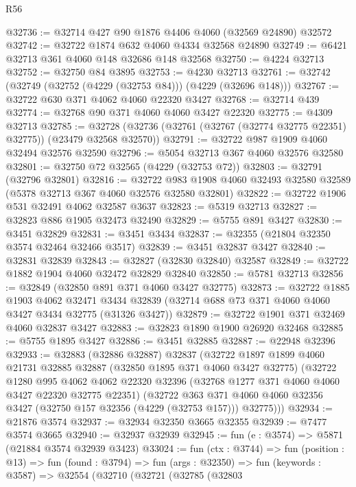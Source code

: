 \begin{lexlean}{R56}
\begin{coremodule}
@32736 := @32714 @427 @90 @1876 @4406 @4060 (@32569 @24890) @32572
@32742 := @32722 @1874 @632 @4060 @4334 @32568 @24890
@32749 := @6421 @32713 @361 @4060 @148 @32686 @148 @32568
@32750 := @4224 @32713
@32752 := @32750 @84 @3895
@32753 := @4230 @32713
@32761 := @32742 (@32749 (@32752 (@4229 (@32753 @84))) (@4229 (@32696 @148)))
@32767 := @32722 @630 @371 @4062 @4060 @22320 @3427
@32768 := @32714 @439
@32774 := @32768 @90 @371 @4060 @4060 @3427 @22320
@32775 := @4309 @32713
@32785 := @32728 (@32736 (@32761 (@32767 (@32774 @32775 @22351) @32775)) (@23479 @32568 @32570))
@32791 := @32722 @987 @1909 @4060 @32494 @32576 @32590
@32796 := @5054 @32713 @367 @4060 @32576 @32580
@32801 := @32750 @72 @32565 (@4229 (@32753 @72))
@32803 := @32791 (@32796 @32801)
@32816 := @32722
    @983
    @1908
    @4060
    @32493
    @32580
    @32589
    (@5378 @32713 @367 @4060 @32576 @32580 @32801)
@32822 := @32722 @1906 @531 @32491 @4062 @32587 @3637
@32823 := @5319 @32713
@32827 := @32823 @886 @1905 @32473 @32490
@32829 := @5755 @891 @3427
@32830 := @3451 @32829
@32831 := @3451 @3434
@32837 := @32355 (@21804 @32350 @3574 @32464 @32466 @3517)
@32839 := @3451 @32837 @3427
@32840 := @32831 @32839
@32843 := @32827 (@32830 @32840) @32587
@32849 := @32722 @1882 @1904 @4060 @32472 @32829 @32840
@32850 := @5781 @32713
@32856 := @32849 (@32850 @891 @371 @4060 @3427 @32775)
@32873 := @32722
    @1885
    @1903
    @4062
    @32471
    @3434
    @32839
    (@32714 @688 @73 @371 @4060 @4060 @3427 @3434 @32775 (@31326 @3427))
@32879 := @32722 @1901 @371 @32469 @4060 @32837 @3427
@32883 := @32823 @1890 @1900 @26920 @32468
@32885 := @5755 @1895 @3427
@32886 := @3451 @32885
@32887 := @22948 @32396
@32933 := @32883
    (@32886 @32887)
    @32837
    (@32722
      @1897
      @1899
      @4060
      @21731
      @32885
      @32887
      (@32850 @1895 @371 @4060 @3427 @32775)
      (@32722
        @1280
        @995
        @4062
        @4062
        @22320
        @32396
        (@32768 @1277 @371 @4060 @4060 @3427 @22320 @32775 @22351)
        (@32722
          @363
          @371
          @4060
          @4060
          @32356
          @3427
          (@32750 @157 @32356 (@4229 (@32753 @157)))
          @32775)))
@32934 := @21876 @3574
@32937 := @32934 @32350 @3665 @32355
@32939 := @7477 @3574 @3665
@32940 := @32937 @32939
@32945 := fun (e : @3574) => @5871 (@21884 @3574 @32939 @3423)
@33024 := fun (ctx : @3744) =>
  fun (position : @13) =>
  fun (found : @3794) =>
  fun (args : @32350) =>
  fun (keywords : @3587) =>
  @32554
    (@32710
      (@32721
        (@32785
          (@32803

\end{coremodule}
\end{lexlean}
